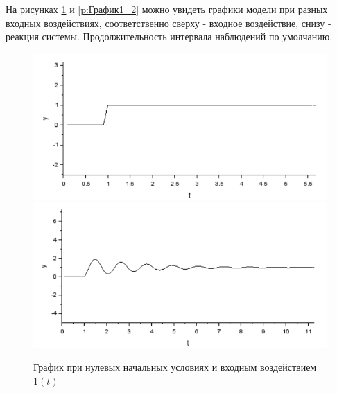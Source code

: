 \documentclass[a4paper, 12pt]{article}
\begin{document}
На рисунках \ref{p:График1_1} и \ref{p:График1_2} можно увидеть графики модели при разных входных воздействиях, соответственно сверху - входное воздействие, снизу - реакция системы. Продолжительность интервала наблюдений по умолчанию.

\begin{figure}[h!]
	\centering
	\includegraphics[scale=0.7]{plot1_3}
	\includegraphics[scale=0.7]{plot1_1}
	\caption{График при нулевых начальных условиях  и входным воздействием $1(t)$ }
	\label{p:График1_1}
\end{figure}  
\end{document}
